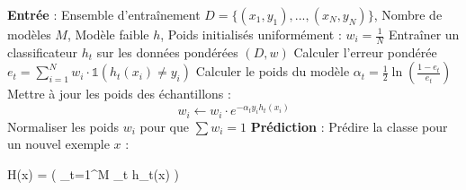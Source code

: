 \begin{algorithm}[H]
\caption{Algorithme d'AdaBoost}
\begin{algorithmic}[1]
\State \textbf{Entrée} : Ensemble d'entraînement \( D = \{(x_1, y_1), ..., (x_N, y_N)\} \), Nombre de modèles \( M \), Modèle faible \( h \), Poids initialisés uniformément : \( w_i = \frac{1}{N} \)
    \State Entraîner un classificateur \( h_t \) sur les données pondérées \( (D, w) \)
    \State Calculer l'erreur pondérée \( e_t = \sum_{i=1}^{N} w_i \cdot \mathbb{1}(h_t(x_i) \neq y_i) \)
    \State Calculer le poids du modèle \( \alpha_t = \frac{1}{2} \ln \left(\frac{1 - e_t}{e_t}\right) \)
    \State Mettre à jour les poids des échantillons :
    \[
    w_i \leftarrow w_i \cdot e^{-\alpha_t y_i h_t(x_i)}
    \]
    \State Normaliser les poids \( w_i \) pour que \( \sum w_i = 1 \)
\EndFor
\State \textbf{Prédiction} : 
\State Prédire la classe pour un nouvel exemple \( x \) : 

H(x) =  \left( \sum_{t=1}^{M} \alpha_t h_t(x) \right)
\end{algorithmic}
\end{algorithm}
